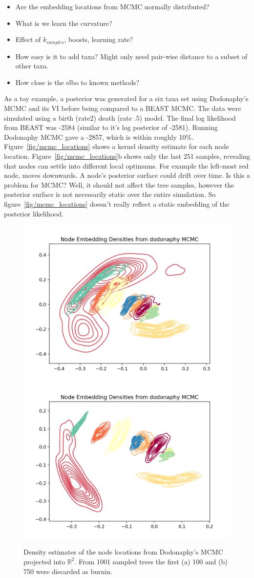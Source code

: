 \documentclass[11pt]{article}
\begin{document}
\begin{itemize}
\item Are the embedding locations from MCMC normally distributed?
\item What is we learn the curvature?
\item Effect of $k_{samples}$, boosts, learning rate?
\item How easy is it to add taxa? Might only need pair-wise distance to a subset of other taxa.
\item How close is the elbo to known methods?
\end{itemize}

As a toy example, a posterior was generated for a six taxa set using Dodonaphy's MCMC and its VI before being compared to a BEAST MCMC. The data were simulated using a birth (rate$2$) death (rate $.5$) model. The final log likelihood from BEAST was -2584 (similar to it's log posterior of -2581). Running Dodonaphy MCMC gave a -2857, which is within roughly 10\%. Figure~\ref{fig/mcmc_locations} shows a kernel density estimate for each node location. Figure~\ref{fig/mcmc_locations}b shows only the last 251 samples, revealing that nodes can settle into different local optimums. For example the left-most red node, moves downwards. A node's posterior surface could drift over time. Is this a problem for MCMC? Well, it should not affect the tree samples, however the posterior surface is not necessarily static over the entire simulation. So figure~\ref{fig/mcmc_locations} doesn't really reflect a static embedding of the posterior likelihood.

\begin{figure}[htbp]
\begin{center}
\includegraphics[width=.5\linewidth]{fig/mcmc_locations.png}%
\includegraphics[width=.5\linewidth]{fig/mcmc_locations_last250.png}
\caption{Density estimates of the node locations from Dodonaphy's MCMC projected into $\mathbb{R}^{2}$. From 1001 sampled trees the first (a) 100 and (b) 750 were discarded as burnin.}
\label{default}
\end{center}
\end{figure}
\end{document}
